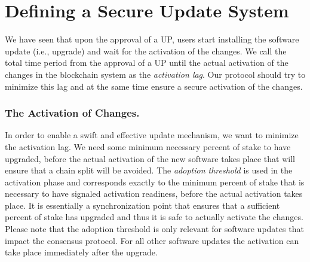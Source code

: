 \section{Defining a Secure Update System} \label{secureupdate}
We have seen that upon the approval of a UP, users start installing the software update (i.e., upgrade) and wait for the activation of the changes. We call the total  time period from the approval of a UP until the actual activation of the changes in the blockchain system as the \emph{activation lag}. Our protocol should try to minimize this lag and at the same time ensure a secure activation of the changes.


\subsubsection{The Activation of Changes.}\label{se:informal}
In order to enable a swift and effective update mechanism, we want to minimize the activation lag. 
We need some minimum necessary percent of stake to have upgraded, before the actual activation of the new software takes place that will ensure that a chain split will be avoided. The \emph{adoption threshold} is used in the activation phase and corresponds exactly to the minimum percent of stake that is necessary to have signaled activation readiness, before the actual activation takes place. It is essentially a synchronization point that ensures that a sufficient percent of stake has upgraded and thus it is safe to actually activate the changes. 
 Please note that the adoption threshold is only relevant for software updates that impact the consensus protocol. For all other software updates the activation can take place immediately after the upgrade.

